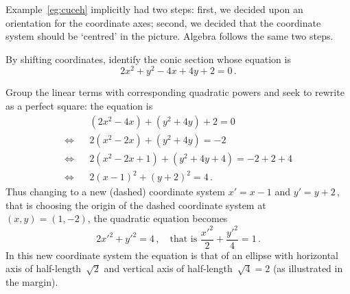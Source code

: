 \begin{description}
\begin{itemize}
\end{itemize}
\end{description}


Example~\ref{eg:cuceh} implicitly had two steps: first, we decided upon an orientation for the coordinate axes; second, we decided that the coordinate system should be `centred' in the picture.
Algebra follows the same two steps.

\begin{example} \label{eg:}
By shifting coordinates, identify the conic section whose equation is
\begin{equation*}
2x^2+y^2-4x+4y+2=0\,.
\end{equation*}
\begin{solution} 
Group the linear terms with corresponding quadratic powers and seek to rewrite as a perfect square: the equation is
\begin{eqnarray*}&&
(2x^2-4x)+(y^2+4y)+2=0
\\\iff&&
2(x^2-2x)+(y^2+4y)=-2
\\\iff&&
2(x^2-2x+1)+(y^2+4y+4)=-2+2+4
\\\iff&&
2(x-1)^2+(y+2)^2=4\,.
\end{eqnarray*}
Thus changing to a new (dashed) coordinate system \(x'=x-1\) and \(y'=y+2\)\,, that is choosing the origin of the dashed coordinate system at \((x,y)=(1,-2)\), the quadratic equation becomes
%
\begin{equation*}
2{x'}^2+{y'}^2=4\,, \quad\text{that is }
\frac{{x'}^2}{2}+\frac{{y'}^2}{4}=1\,.
\end{equation*}
In this new coordinate system the equation is that of an ellipse with horizontal axis of half-length~\(\sqrt2\) and vertical axis of half-length~\(\sqrt4=2\) (as illustrated in the margin).
\end{solution}
\end{example}


